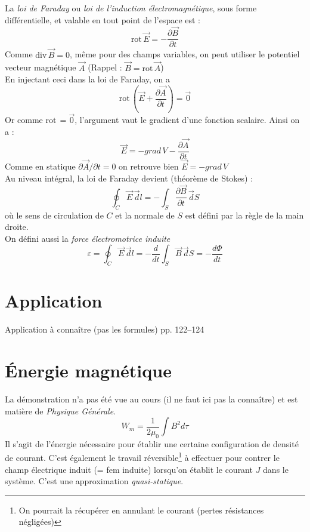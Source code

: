 \documentclass	[11pt, a4paper, openany]{book}
\newcommand{\rot}{\text{rot}\,}
\newcommand{\divv}{\text{div}\,}
\begin{document}
	La \textit{loi de Faraday} ou \textit{loi de l'induction électromagnétique}, sous forme différentielle, et valable en tout point de l'espace est : \begin{equation}
	\rot\vec E=-\frac{\partial \vec B}{\partial t}
	\end{equation}
	Comme $\divv\vec B=0$, même pour des champs variables, on peut utiliser le potentiel vecteur magnétique $\vec A$ (Rappel : $\vec B=\rot\vec A$)\\
	En injectant ceci dans la loi de Faraday, on a \begin{equation}
	\rot\left(\vec E+\frac{\partial \vec A}{\partial t}\right)=\vec{0}
	\end{equation}
	Or comme $\rot =\vec{0}$, l'argument vaut le gradient d'une fonction scalaire. Ainsi on a : \begin{equation}
	\vec E=-grad\,V-\frac{\partial\vec A}{\partial t}
	\end{equation}
	Comme en statique $\partial\vec A/\partial t=0$ on retrouve bien $\vec E=-grad\,V$\\
	Au niveau intégral, la loi de Faraday devient (théorème de Stokes) : \begin{equation}
	\oint_C\vec E\,\vec dl=-\int_S\frac{\partial\vec B}{\partial t}\,\vec dS
	\end{equation}où le sens de circulation de $C$ et la normale de $S$ est défini par la règle de la main droite.\\
	On défini aussi la \textit{force électromotrice induite}\begin{equation}
	\varepsilon=\oint_C\vec E\,\vec dl=-\frac{d}{dt}\int_S\vec B\,\vec dS=-\frac{d\Phi}{dt}
	\end{equation}
	\setcounter{section}{2}
	\section{Application}
	Application à connaître (pas les formules) pp. 122--124
	\section{Énergie magnétique}
	La démonstration n'a pas été vue au cours (il ne faut ici pas la connaître) et est matière de \textit{Physique Générale}.
	\begin{equation}
		W_m = \frac{1}{2\mu_0}\int B^2 d\tau
	\end{equation}
	Il s'agit de l'énergie nécessaire pour établir une certaine configuration de densité de courant. C'est également le travail réversible\footnote{On pourrait la récupérer en annulant le courant (pertes résistances négligées)} à effectuer pour contrer le champ électrique induit (= fem induite) lorsqu'on établit le courant $J$ dans le système. C'est une approximation \textit{quasi-statique}.
	
\end{document}
